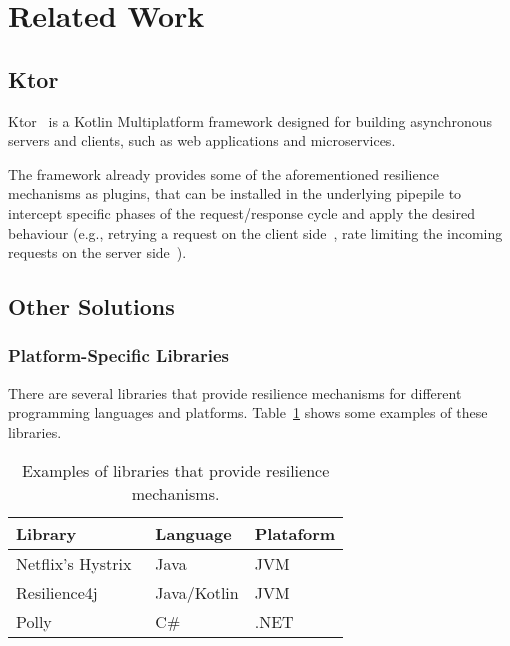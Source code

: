 \section{Related Work}\label{sec:related-work}

\subsection{Ktor}\label{subsec:ktor}
Ktor~\cite{ktor} is a Kotlin Multiplatform framework designed for building asynchronous servers and clients, such as web applications and microservices.

The framework already provides some of the aforementioned resilience mechanisms as plugins,
that can be installed in the underlying pipepile
to intercept specific phases of the request/response cycle and apply the desired behaviour
(e.g., retrying a request on the client side~\cite{ktor-client-retry},
rate limiting the incoming requests on the server side~\cite{ktor-server-rate-limit}).

\subsection{Other Solutions}\label{subsec:other-solutions}

\subsubsection{Platform-Specific Libraries}

There are several libraries that provide resilience mechanisms for different programming languages and platforms.
Table~\ref{tab:resilience_libraries} shows some examples of these libraries.

\begin{table}[!htb]
    \centering
    \caption{Examples of libraries that provide resilience mechanisms.}
    \label{tab:resilience_libraries}
    \vspace{0.3cm}
    \begin{tabular}{|l|l|l|}
        \hline
        \textbf{Library}                         & \textbf{Language} & \textbf{Plataform} \\ \hline
        Netflix's Hystrix~\cite{netflix-hystrix} & Java              & JVM                \\ \hline
        Resilience4j~\cite{resilience4j}         & Java/Kotlin       & JVM                \\ \hline
        Polly ~\cite{polly-dotnet}               & C\#               & .NET               \\
        \hline
    \end{tabular}
\end{table}

